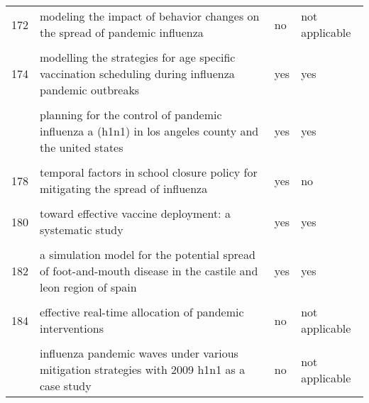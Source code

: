 \documentclass[
]{article}
\begin{document}
\begin{landscape}
\begin{longtable}{l>{\raggedright\arraybackslash}p{9cm}ll}
172 & modeling the impact of behavior changes on the spread of pandemic influenza & no & not applicable\\
\cellcolor{gray!6}{173} & \cellcolor{gray!6}{modelling and analysis of influenza a (h1n1) on networks} & \cellcolor{gray!6}{yes} & \cellcolor{gray!6}{no}\\
174 & modelling the strategies for age specific vaccination scheduling during influenza pandemic outbreaks & yes & yes\\
\cellcolor{gray!6}{175} & \cellcolor{gray!6}{modelling the transmission dynamics and control of the novel 2009 swine influenza (h1n1) pandemic} & \cellcolor{gray!6}{yes} & \cellcolor{gray!6}{yes}\\
\addlinespace
176 & planning for the control of pandemic influenza a (h1n1) in los angeles county and the united states & yes & yes\\
\cellcolor{gray!6}{177} & \cellcolor{gray!6}{prioritization of delayed vaccination for pandemic influenza} & \cellcolor{gray!6}{no} & \cellcolor{gray!6}{not applicable}\\
178 & temporal factors in school closure policy for mitigating the spread of influenza & yes & no\\
\cellcolor{gray!6}{179} & \cellcolor{gray!6}{the global transmission and control of influenza} & \cellcolor{gray!6}{yes} & \cellcolor{gray!6}{yes}\\
180 & toward effective vaccine deployment: a systematic study & yes & yes\\
\addlinespace
\cellcolor{gray!6}{181} & \cellcolor{gray!6}{vaccination against 2009 pandemic h1n1 in a population dynamical model of vancouver, canada: timing is everything} & \cellcolor{gray!6}{no} & \cellcolor{gray!6}{not applicable}\\
182 & a simulation model for the potential spread of foot-and-mouth disease in the castile and leon region of spain & yes & yes\\
\cellcolor{gray!6}{183} & \cellcolor{gray!6}{community-based measures for mitigating the 2009 h1n1 pandemic in china} & \cellcolor{gray!6}{yes} & \cellcolor{gray!6}{yes}\\
184 & effective real-time allocation of pandemic interventions & no & not applicable\\
\cellcolor{gray!6}{185} & \cellcolor{gray!6}{efficient mitigation strategies for epidemics in rural regions} & \cellcolor{gray!6}{yes} & \cellcolor{gray!6}{yes}\\
\addlinespace
186 & influenza pandemic waves under various mitigation strategies with 2009 h1n1 as a case study & no & not applicable\\

\end{longtable}
\end{landscape}
\end{document}
